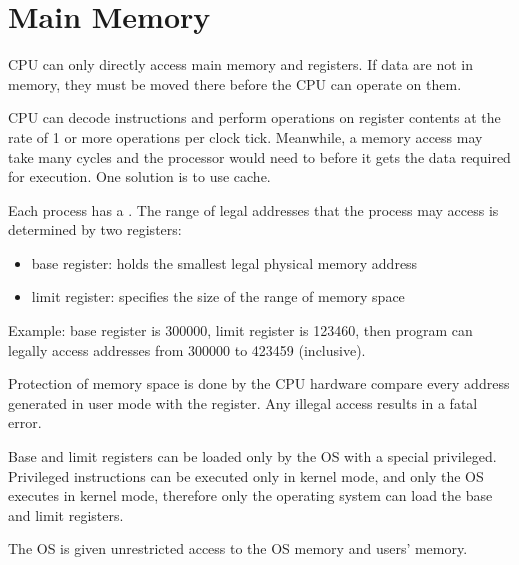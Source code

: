 
\chapter{Main Memory}

    \par CPU can only directly access main memory and registers. If data are not in memory, they must be moved there before the CPU can operate on them.
    \par CPU can decode instructions and perform operations on register contents at the rate of 1 or more operations per clock tick. Meanwhile, a memory access may take many cycles and the processor would need to  before it gets the data required for execution. One solution is to use cache.
    \par Each process has a . The range of legal addresses that the process may access is determined by two registers:
    \begin{itemize}
      \item base register: holds the smallest legal physical memory address
      \item limit register: specifies the size of the range of memory space
    \end{itemize}
    \par Example: base register is 300000, limit register is 123460, then program can legally access addresses from 300000 to 423459 (inclusive).
    \par Protection of memory space is done by the CPU hardware compare every address generated in user mode with the register. Any illegal access results in a fatal error.
    \par Base and limit registers can be loaded only by the OS with a special privileged. Privileged instructions can be executed only in kernel mode, and only the OS executes in kernel mode, therefore only the operating system can load the base and limit registers.
    \par The OS is given unrestricted access to the OS memory and users' memory.

